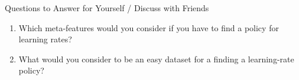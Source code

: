 \begin{frame}[c]{Questions to Answer for Yourself / Discuss with Friends}
    
    \begin{enumerate}
        \item Which meta-features would you consider if you have to find a policy for learning rates?
        \item What would you consider to be an easy dataset for a finding a learning-rate policy?
    \end{enumerate}
    
\end{frame}

